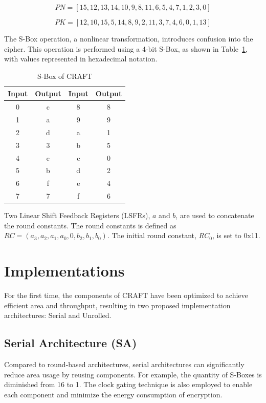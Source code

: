 \documentclass[final,5p,times,twocolumn]{elsarticle}
\begin{document}
\begin{equation}
    PN=[15,12,13,14,10,9,8,11,6,5,4,7,1,2,3,0]
    \label{permute_nibb_eq}
\end{equation}

\begin{equation}
    PK=[12,10,15,5,14,8,9,2,11,3,7,4,6,0,1,13]
    \label{key_schedule_eq}
\end{equation}

The S-Box operation, a nonlinear transformation, introduces confusion into the cipher.
This operation is performed using a 4-bit S-Box, as shown in Table~\ref{tab4}, with values represented in hexadecimal notation.

\begin{table}[h]
    \centering
    \caption{S-Box of CRAFT}\label{tab4}%
    \begin{tabular}{|c|c|c|c|}
        \hline
        Input & Output & Input & Output \\
        \hline
        0     & c      & 8     & 8      \\
        1     & a      & 9     & 9      \\
        2     & d      & a     & 1      \\
        3     & 3      & b     & 5      \\
        4     & e      & c     & 0      \\
        5     & b      & d     & 2      \\
        6     & f      & e     & 4      \\
        7     & 7      & f     & 6      \\
        \hline
    \end{tabular}
\end{table}

Two Linear Shift Feedback Registers (LSFRs), $a$ and $b$, are used to concatenate the round constants.
The round constants is defined as $RC=(a_3,a_2,a_1,a_0,0,b_2,b_1,b_0)$. The initial round constant, $RC_0$, is set to 0x11.

\section{Implementations}\label{sec3}

For the first time, the components of CRAFT have been optimized to achieve efficient area and throughput, resulting in two proposed implementation architectures: Serial and Unrolled.


\subsection{Serial Architecture (SA)}\label{subsec2}
Compared to round-based architectures, serial architectures can significantly reduce area usage by reusing components.
For example, the quantity of S-Boxes is diminished from 16 to 1.
The clock gating technique is also employed to enable each component and minimize the energy consumption of encryption.
\end{document}
